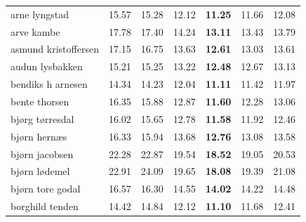 \documentclass{article}
\begin{document}
\begin{table}[ht]
\begin{tabular}{lrrrrrr}
        arne lyngstad          & 15.57 & 15.28 & 12.12 & \textbf{11.25} & 11.66 & 12.08 \\
        arve kambe             & 17.78 & 17.40 & 14.24 & \textbf{13.11} & 13.43 & 13.79 \\
        asmund kristoffersen   & 17.15 & 16.75 & 13.63 & \textbf{12.61} & 13.03 & 13.61 \\
        audun lysbakken        & 15.21 & 15.25 & 13.22 & \textbf{12.48} & 12.67 & 13.13 \\
        bendiks h arnesen      & 14.34 & 14.23 & 12.04 & \textbf{11.11} & 11.42 & 11.97 \\
        bente thorsen          & 16.35 & 15.88 & 12.87 & \textbf{11.60} & 12.28 & 13.06 \\
        bjørg tørresdal        & 16.02 & 15.65 & 12.78 & \textbf{11.58} & 11.92 & 12.46 \\
        bjørn hernæs           & 16.33 & 15.94 & 13.68 & \textbf{12.76} & 13.08 & 13.58 \\
        bjørn jacobsen         & 22.28 & 22.87 & 19.54 & \textbf{18.52} & 19.05 & 20.53 \\
        bjørn lødemel          & 22.91 & 24.09 & 19.65 & \textbf{18.08} & 19.39 & 21.08 \\
        bjørn tore godal       & 16.57 & 16.30 & 14.55 & \textbf{14.02} & 14.22 & 14.48 \\
        borghild tenden        & 14.42 & 14.84 & 12.12 & \textbf{11.10} & 11.68 & 12.41 \\
        \bottomrule
    \end{tabular}
\end{table}
\end{document}

